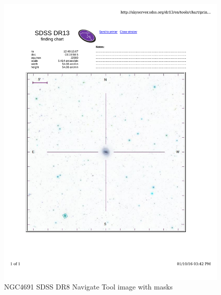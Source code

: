 \documentclass[10pt,letterpaper]{article}
\begin{document}
\begin{figure}[h!]
\centering
\includegraphics[scale=0.7]{figures/NGC4691.pdf}
\caption{NGC4691 SDSS DR8 Navigate Tool image with masks}
\end{figure}
\end{document}
